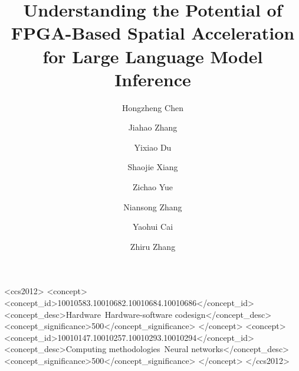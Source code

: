 \documentclass[acmsmall,nonacm,screen]{acmart}
\begin{document}
\title{Understanding the Potential of FPGA-Based Spatial Acceleration for Large Language Model Inference}

\author{Hongzheng Chen}

\author{Jiahao Zhang}

\author{Yixiao Du}
\author{Shaojie Xiang}
\author{Zichao Yue}

\author{Niansong Zhang}
\author{Yaohui Cai}
\author{Zhiru Zhang}

\renewcommand{\shortauthors}{Chen et al.}



\begin{CCSXML}
<ccs2012>
<concept>
<concept_id>10010583.10010682.10010684.10010686</concept_id>
<concept_desc>Hardware~Hardware-software codesign</concept_desc>
<concept_significance>500</concept_significance>
</concept>
<concept>
<concept_id>10010147.10010257.10010293.10010294</concept_id>
<concept_desc>Computing methodologies~Neural networks</concept_desc>
<concept_significance>500</concept_significance>
</concept>
</ccs2012>
\end{CCSXML}
\end{document}
